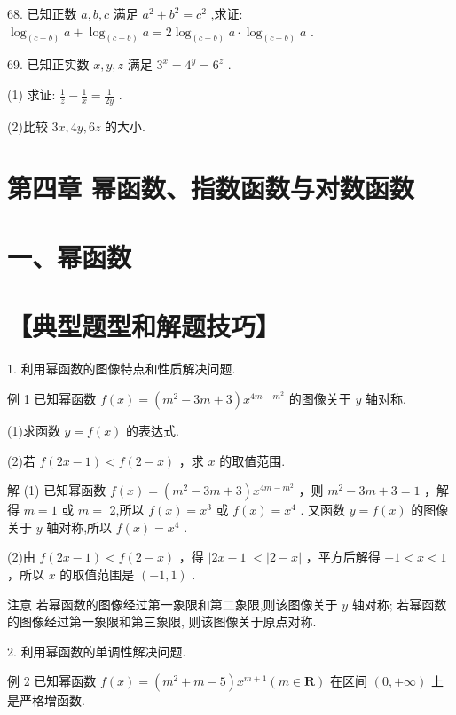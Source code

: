 \documentclass[10pt]{article}
\begin{document}
68. 已知正数 \(a,b,c\) 满足 \({a}^{2} + {b}^{2} = {c}^{2}\) ,求证: \({\log }_{\left( c + b\right) }a + {\log }_{\left( c - b\right) }a = 2{\log }_{\left( c + b\right) }a \cdot  {\log }_{\left( c - b\right) }a\) .

69. 已知正实数 \(x,y,z\) 满足 \({3}^{x} = {4}^{y} = {6}^{z}\) .

(1) 求证: \(\frac{1}{z} - \frac{1}{x} = \frac{1}{2y}\) .

(2)比较 \({3x},{4y},{6z}\) 的大小.

\section*{第四章 幂函数、指数函数与对数函数}

\section*{一、幂函数}

\section*{【典型题型和解题技巧】}

1. 利用幂函数的图像特点和性质解决问题.

例 1 已知幂函数 \(f\left( x\right)  = \left( {{m}^{2} - {3m} + 3}\right) {x}^{{4m} - {m}^{2}}\) 的图像关于 \(y\) 轴对称.

(1)求函数 \(y = f\left( x\right)\) 的表达式.

(2)若 \(f\left( {{2x} - 1}\right)  < f\left( {2 - x}\right)\) ，求 \(x\) 的取值范围.

解 (1) 已知幂函数 \(f\left( x\right)  = \left( {{m}^{2} - {3m} + 3}\right) {x}^{{4m} - {m}^{2}}\) ，则 \({m}^{2} - {3m} + 3 = 1\) ，解得 \(m = 1\) 或 \(m =\) 2,所以 \(f\left( x\right)  = {x}^{3}\) 或 \(f\left( x\right)  = {x}^{4}\) . 又函数 \(y = f\left( x\right)\) 的图像关于 \(y\) 轴对称,所以 \(f\left( x\right)  = {x}^{4}\) .

(2)由 \(f\left( {{2x} - 1}\right)  < f\left( {2 - x}\right)\) ，得 \(\left| {{2x} - 1}\right|  < \left| {2 - x}\right|\) ，平方后解得 \(- 1 < x < 1\) ，所以 \(x\) 的取值范围是 \(\left( {-1,1}\right)\) .

注意 若幂函数的图像经过第一象限和第二象限,则该图像关于 \(y\) 轴对称; 若幂函数的图像经过第一象限和第三象限, 则该图像关于原点对称.

2. 利用幂函数的单调性解决问题.

例 2 已知幂函数 \(f\left( x\right)  = \left( {{m}^{2} + m - 5}\right) {x}^{m + 1}\left( {m \in  \mathbf{R}}\right)\) 在区间 \(\left( {0, + \infty }\right)\) 上是严格增函数.
\end{document}

